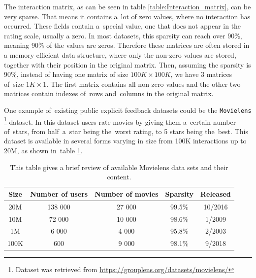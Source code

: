 The interaction matrix, as can be seen in table \ref{table:Interaction_matrix}, can be very sparse. That means it contains a~lot of zero values, where no interaction has occurred. These fields contain a~special value, one that does not appear in the rating scale, usually a zero. In most datasets, this sparsity can reach over 90\%, meaning 90\% of the values are zeros. 
Therefore these matrices are often stored in a memory efficient data structure, where only the non-zero values are stored, together with their position in the original matrix. Then, assuming the sparsity is 90\%, instead of having one matrix of size $100K \times 100K$, we have 3 matrices of~size $1K \times 1$. The first matrix contains all non-zero values and the other two matrices contain indexes of~rows and~columns in the original matrix.


One example of~existing public explicit feedback datasets could be the \texttt{Movielens} \footnote{Dataset was retrieved from \url{https://grouplens.org/datasets/movielens/}} dataset. In this dataset users rate movies by giving them a~certain number of~stars, from half~a~star being the~worst rating, to 5 stars being the~best. This dataset is available in several forms varying in size from 100K interactions up to 20M, as shown in~table \ref{table:movielens}. \\

\begin{table}[h!]
    \centering
    \begin{tabular}{@{}ccccc@{}}
    \toprule
    \textbf{Size} & \textbf{Number of users} & \textbf{Number of movies} & \textbf{Sparsity} & \textbf{Released} \\ \midrule
    \rowcolor[HTML]{EFEFEF}
    20M           & 138 000                                          & 27 000                                            & 99.5\%            & 10/2016           \\
    10M           & 72 000                                           & 10 000                                            & 98.6\%            & 1/2009            \\
    \rowcolor[HTML]{EFEFEF}
    1M            & 6 000                                            & 4 000                                             & 95.8\%            & 2/2003            \\
    100K          & 600                                              & 9 000                                             & 98.1\%            & 9/2018            \\ \bottomrule
    \end{tabular}
    \caption{This table gives a brief review of available Movielens data sets and their content.}
    \label{table:movielens}
\end{table}

